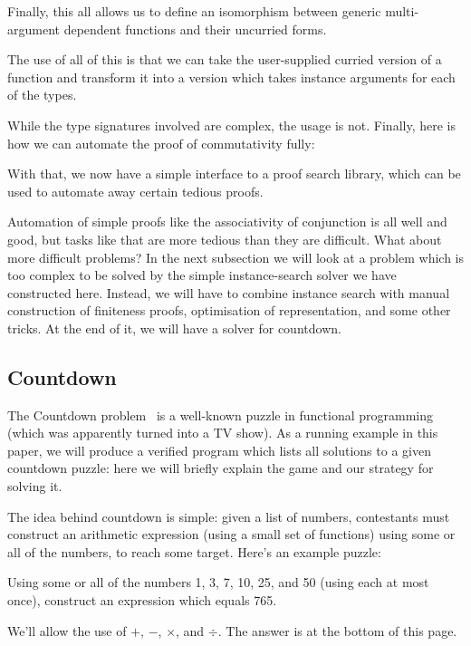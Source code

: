 

Finally, this all allows us to define an isomorphism between generic
multi-argument dependent functions and their uncurried forms.



The use of all of this is that we can take the user-supplied curried version of
a function and transform it into a version which takes instance arguments for
each of the types.




While the type signatures involved are complex, the usage is not.
Finally, here is how we can automate the proof of commutativity fully:



With that, we now have a simple interface to a proof search library, which can
be used to automate away certain tedious proofs.

Automation of simple proofs like the associativity of conjunction is all well
and good, but tasks like that are more tedious than they are difficult.
What about more difficult problems?
In the next subsection we will look at a problem which is too complex to be solved
by the simple instance-search solver we have constructed here.
Instead, we will have to combine instance search with manual construction of
finiteness proofs, optimisation of representation, and some other tricks.
At the end of it, we will have a solver for countdown.

\subsection{Countdown}

The Countdown problem~\citep{huttonCountdownProblem2002} is a well-known puzzle
in functional programming (which was apparently turned into a TV show).
As a running example in this paper, we will produce a verified program which
lists all solutions to a given countdown puzzle: here we will briefly explain
the game and our strategy for solving it.

The idea behind countdown is simple: given a list of numbers, contestants must
construct an arithmetic expression (using a small set of functions) using some
or all of the numbers, to reach some target.
Here's an example puzzle:
\begin{displayquote}
  Using some or all of the numbers 1, 3, 7, 10, 25, and 50 (using each at most
  once), construct an expression which equals 765.
\end{displayquote}
We'll allow the use of \(+\), \(-\), \(\times\), and \(\div\).
The answer is at the bottom of this page\footnotemark.

